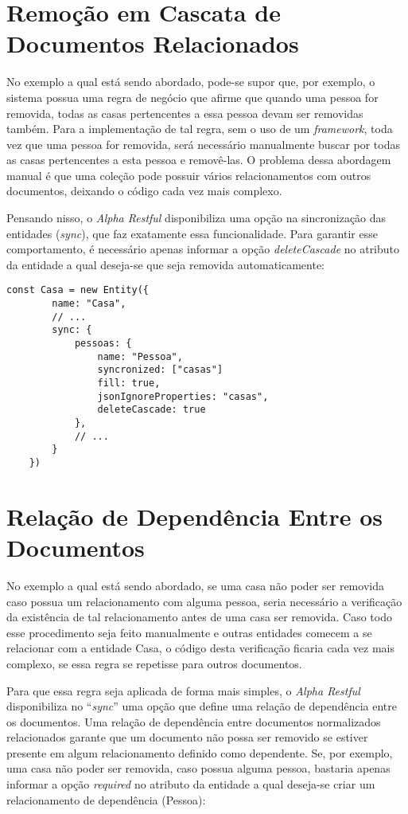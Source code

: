 \section{Remoção em Cascata de Documentos Relacionados}
    
No exemplo a qual está sendo abordado, pode-se supor que, por exemplo, o sistema possua uma regra de negócio que afirme que quando uma pessoa for removida, todas as casas pertencentes a essa pessoa devam ser removidas também. Para a implementação de tal regra, sem o uso de um \textit{framework}, toda vez que uma pessoa for removida, será necessário manualmente buscar por todas as casas pertencentes a esta pessoa e removê-las. O problema dessa abordagem manual é que uma coleção pode possuir vários relacionamentos com outros documentos, deixando o código cada vez mais complexo.

Pensando nisso, o \textit{Alpha Restful} disponibiliza uma opção na sincronização das entidades (\textit{sync}), que faz exatamente essa funcionalidade. Para garantir esse comportamento, é necessário apenas informar a opção \textit{deleteCascade} no atributo da entidade a qual deseja-se que seja removida automaticamente:

\begin{lstlisting}[style=ES6, caption={Modelagem de ``Casa'' com \textit{deleteCascade}}]
    const Casa = new Entity({
        name: "Casa",
        // ...
        sync: {
            pessoas: {
                name: "Pessoa",
                syncronized: ["casas"]
                fill: true,
                jsonIgnoreProperties: "casas",
                deleteCascade: true
            },
            // ...
        }
    })
\end{lstlisting}

\section{Relação de Dependência Entre os Documentos}

No exemplo a qual está sendo abordado, se uma casa não poder ser removida caso possua um relacionamento com alguma pessoa, seria necessário a verificação da existência de tal relacionamento antes de uma casa ser removida. Caso todo esse procedimento seja feito manualmente e outras entidades comecem a se relacionar com a entidade Casa, o código desta verificação ficaria cada vez mais complexo, se essa regra se repetisse para outros documentos.

Para que essa regra seja aplicada de forma mais simples, o \textit{Alpha Restful} disponibiliza no ``\textit{sync}'' uma opção que define uma relação de dependência entre os documentos. Uma relação de dependência entre documentos normalizados relacionados garante que um documento não possa ser removido se estiver presente em algum relacionamento definido como dependente. Se, por exemplo, uma casa não poder ser removida, caso possua alguma pessoa, bastaria apenas informar a opção \textit{required} no atributo da entidade a qual deseja-se criar um relacionamento de dependência (Pessoa):

